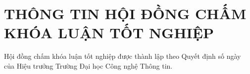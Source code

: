 \chapter*{THÔNG TIN HỘI ĐỒNG CHẤM KHÓA LUẬN TỐT NGHIỆP}

Hội đồng chấm khóa luận tốt nghiệp được thành lập theo Quyết định số \dotfill{} ngày \dotfill{} của Hiệu trưởng Trường Đại học Công nghệ Thông tin.

\cleardoublepage
